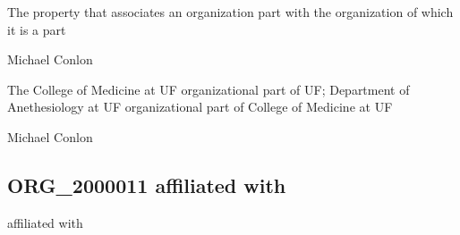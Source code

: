 \documentclass[letterpaper,10pt,english]{sphinxmanual}
\begin{document}
\begin{sphinxShadowBox}

\sphinxAtStartPar
The property that associates an organization part with the organization of which it is a part
\end{sphinxShadowBox}

\begin{sphinxShadowBox}

\sphinxAtStartPar
Michael Conlon 
\end{sphinxShadowBox}

\begin{sphinxShadowBox}

\sphinxAtStartPar
{\hyperref[\detokenize{doc-ORG_0000005::doc}]{}}
\end{sphinxShadowBox}

\begin{sphinxShadowBox}

\sphinxAtStartPar
{\hyperref[\detokenize{doc-ORG_0000001::doc}]{}}
\end{sphinxShadowBox}

\begin{sphinxShadowBox}

\sphinxAtStartPar
The College of Medicine at UF organizational part of UF; Department of Anethesiology at UF organizational part of College of Medicine at UF
\end{sphinxShadowBox}

\begin{sphinxShadowBox}

\sphinxAtStartPar
Michael Conlon 
\end{sphinxShadowBox}
\begin{quote}

\ignorespaces \end{quote}


\subsection{ORG\_2000011 \sphinxhyphen{} affiliated with}
\label{\detokenize{doc-ORG_2000011:org-2000011-affiliated-with}}\label{\detokenize{doc-ORG_2000011:index-0}}\label{\detokenize{doc-ORG_2000011::doc}}
\begin{sphinxShadowBox}

\sphinxAtStartPar
affiliated with
\end{sphinxShadowBox}
\end{document}
